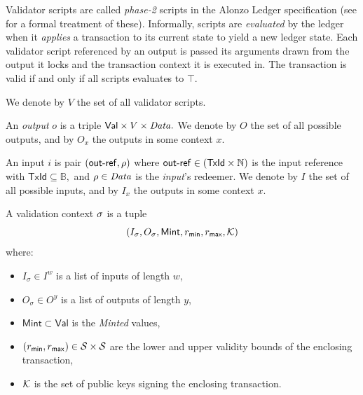 Validator scripts are called \emph{phase-2} scripts in the Alonzo Ledger specification (see \cite{alozon-spec} for a formal treatment of these). Informally, scripts are \emph{evaluated} by the ledger when it \emph{applies} a transaction to its current state to yield a new ledger state. Each validator script referenced by an output is passed its arguments drawn from the output it locks and the transaction context it is executed in. The transaction is valid if and only if all scripts evaluates to $\top.$

We denote by $V$ the set of all validator scripts.

\begin{definition}[Outputs]
\label{def:outputs}
An \emph{output} $o$ is a triple $\mathsf{Val} \times V \times \mathit{Data}.$
We denote by $O$ the set of all possible outputs, and by $O_x$ the outputs in some context $x$.
\end{definition}

\begin{definition}[Inputs]
An input $i$ is pair $(\mathsf{out\textsf{-}{}ref}, \rho)$ where 
$\mathsf{out\textsf{-}{}ref} \in (\mathsf{TxId} \times \mathbb{N})$ is the input reference with $\mathsf{TxId} \subseteq \mathbb{B},$ and $\rho \in \mathit{Data}$ is the \emph{input}'s redeemer.  We denote by $I$ the set of all possible inputs, and by $I_x$ the outputs in some context $x$.
\end{definition}

\begin{definition}

A validation context $\sigma$ is a tuple  
$$(I_\sigma, O_\sigma, \mathsf{Mint}, r_{\mathsf{min}}, r_{\mathsf{max}}, \mathcal K)$$
where:
\begin{itemize}
    \item $I_\sigma \in I^w$ is a list of inputs of length $w$,
    \item $O_\sigma \in O^y$ is a list of outputs of length $y$,
    \item $\mathsf{Mint} \subset \mathsf{Val}$ is the \emph{Minted} values,
    \item $(r_{\mathsf{min}}, r_{\mathsf{max}}) \in \mathcal{S} \times \mathcal{S}$ are the lower and upper validity bounds of the enclosing transaction,
    \item $\mathcal K$ is the set of public keys signing the enclosing transaction.
\end{itemize}

\end{definition}

